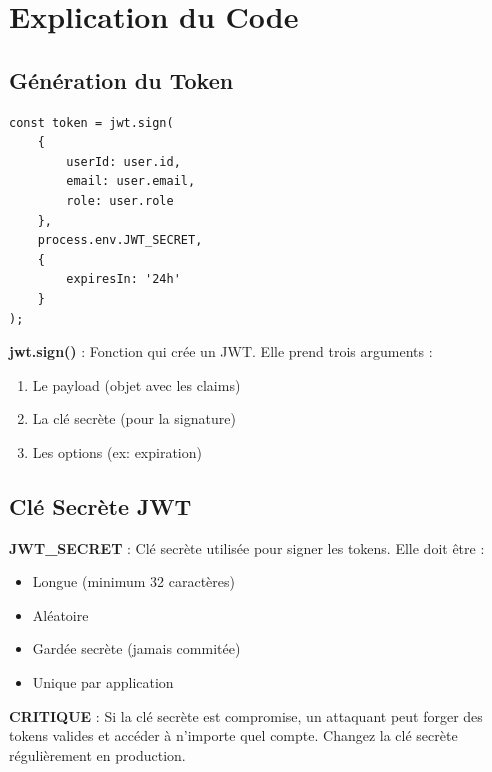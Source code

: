 \section{Explication du Code}

\subsection{Génération du Token}

\begin{lstlisting}[style=javascript]
const token = jwt.sign(
    {
        userId: user.id,
        email: user.email,
        role: user.role
    },
    process.env.JWT_SECRET,
    { 
        expiresIn: '24h'
    }
);
\end{lstlisting}

\begin{definitionbox}
    \textbf{jwt.sign()} : Fonction qui crée un JWT. Elle prend trois arguments :
    \begin{enumerate}
        \item Le payload (objet avec les claims)
        \item La clé secrète (pour la signature)
        \item Les options (ex: expiration)
    \end{enumerate}
\end{definitionbox}

\subsection{Clé Secrète JWT}

\begin{definitionbox}
    \textbf{JWT\_SECRET} : Clé secrète utilisée pour signer les tokens. Elle doit être :
    \begin{itemize}
        \item Longue (minimum 32 caractères)
        \item Aléatoire
        \item Gardée secrète (jamais commitée)
        \item Unique par application
    \end{itemize}
\end{definitionbox}

\begin{warningbox}
    \textbf{CRITIQUE} : Si la clé secrète est compromise, un attaquant peut forger des tokens valides et accéder à n'importe quel compte. Changez la clé secrète régulièrement en production.
\end{warningbox}

